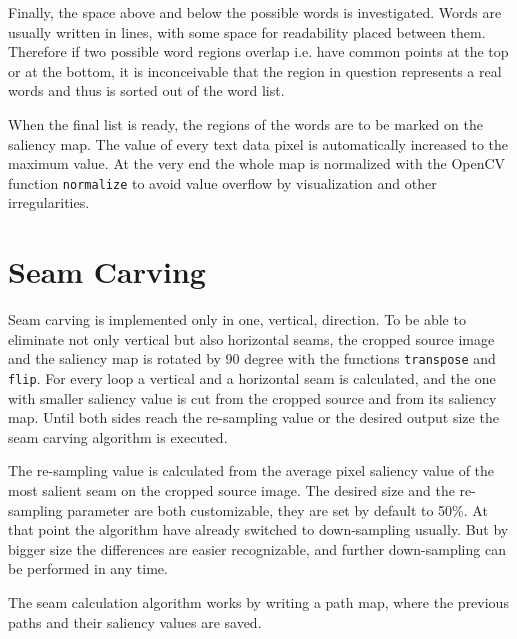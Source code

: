 \documentclass[draft,final]{vutinfth} %
\begin{document}
	Finally, the space above and below the possible words is investigated.
	Words are usually written in lines, with some space for readability placed between them. 
	Therefore if two possible word regions overlap i.e. have  common points at the top or at the bottom, it is inconceivable that the region in question represents a real words and thus is sorted out of the word list.\par 
	When the final list is ready, the regions of the words are to be marked on the saliency map.
	The value of every text data pixel is automatically increased to the maximum value.
	At the very end the whole map is normalized with the OpenCV function \texttt{normalize} to avoid value overflow by visualization and other irregularities.  
	
	\section{Seam Carving}
	Seam carving is implemented only in one, vertical, direction. 
	To be able to eliminate not only vertical but also horizontal seams, the cropped source image and the saliency map is rotated by 90 degree with the functions \texttt{transpose} and \texttt{flip}.
	For every loop a vertical and a horizontal seam is calculated, and the one with smaller saliency value is cut from the cropped source and from its saliency map.
	Until both sides reach the re-sampling value or the desired output size the seam carving algorithm is executed.\par 
	The re-sampling value is calculated from the average pixel saliency value of the most salient seam on the cropped source image.
	The desired size and the re-sampling parameter are both customizable, they are set by default to 50\%.
	At that point the algorithm have already switched to down-sampling usually.
	But by bigger size the differences are easier recognizable, and further down-sampling can be performed in any time.\par   
	The seam calculation algorithm works by writing a path map, where the previous paths and their saliency values are saved.
\end{document}
